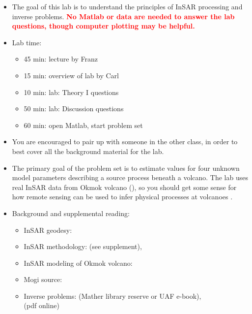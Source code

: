 \documentclass[11pt,titlepage,fleqn]{article}
\begin{document}
\begin{itemize}
\item The goal of this lab is to understand the principles of InSAR processing and inverse problems. 
\textcolor{red}{\bf No Matlab or data are needed to answer the lab questions, though computer plotting may be helpful.}

\item Lab time:
%
\begin{itemize}
\item 45 min: lecture by Franz
\item 15 min: overview of lab by Carl
\item 10 min: lab: Theory I questions
\item 50 min: lab: Discussion questions
\item 60 min: open Matlab, start problem set
\end{itemize}

\item You are encouraged to pair up with someone in the other class, in order to best cover all the background material for the lab.

\item The primary goal of the problem set is to estimate values for four unknown model parameters describing a source process beneath a volcano. The lab uses real InSAR data from Okmok volcano (), so you should get some sense for how remote sensing can be used to infer physical processes at volcanoes \citep[\eg][]{ZLu2005}.

\item Background and supplemental reading:
%
\begin{itemize}
\item InSAR geodesy: \citet{Rosen2000,SimonsRosen2007}

\item InSAR methodology: \citet{Wright2003} (see supplement), \citet{ZLu2007}

\item InSAR modeling of Okmok volcano: \citet{ZLu2005}

\item Mogi source: \citet{Mogi1958}

\item Inverse problems: \citet{AsterE2} (Mather library reserve or UAF e-book), \\
\citet{Tarantola2005} (pdf online)

\end{itemize}

\end{itemize}
\end{document}
